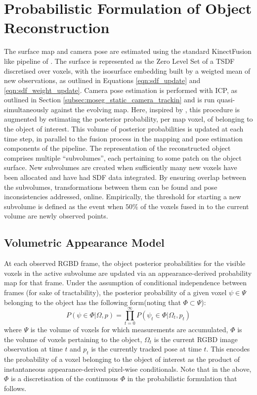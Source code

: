 \section{Probabilistic Formulation of Object Reconstruction}
\label{sec:probobj_prob_formulation}
The surface map and camera pose are estimated using the standard KinectFusion
like pipeline of \cite{Newcombe2011,Prisacariu2014}. The surface is represented
as the Zero Level Set of a TSDF discretised over voxels, with the isosurface 
embedding built by a weigted mean of new observations, as outlined in Equations
\ref{eqn:sdf_update} and \ref{eqn:sdf_weight_update}. Camera pose estimation is
performed with ICP, as outlined in Section \ref{subsec:moseg_static_camera_trackin} 
and is run quasi-simultaneously against the evolving map. Here, inspired by 
\cite{Kolev2006}, this procedure is augmented by estimating the posterior probability, 
per map voxel, of belonging to the object of interest. This volume of posterior 
probabilities is updated at each time step, in parallel to the fusion process in the 
mapping and pose estimation components of the pipeline. The representation of the 
reconstructed object comprises multiple ``subvolumes'', each pertaining to some 
patch on the object surface. New subvolumes are created when sufficiently many new 
voxels have been allocated and have had SDF data integrated. By ensuring overlap
between the subvolumes, transformations between them can be found and pose
inconsistencies addressed, online. Empirically, the threshold for starting a new
subvolume is defined as the event when $50\%$ of the voxels fused in to the
current volume are newly observed points.

\subsection{Volumetric Appearance Model}
\label{subsec:probobj_vol_appearance_model}
At each observed RGBD frame, the object posterior probabilities for the visible
voxels in the active subvolume are updated via an appearance-derived probability
map for that frame. Under the assumption of conditional independence between
frames (for sake of tractability), the posterior probability of a given voxel
$\psi \in \Psi$ belonging to the object has the following form(noting that
$\Phi \subset \Psi$):
\begin{equation}
\label{eqn:probobj_voxel_posterior}
P(\psi \in \Phi | \Omega, p) = \prod_{t=0}^{\infty}
P(\psi_{t} \in \Phi | \Omega_{t}, p_{t})
\end{equation}
where $\Psi$ is the volume of voxels for which measurements are accumulated,
$\Phi$  is the volume of voxels pertaining to the object, $\Omega_{t}$ is the
current RGBD image observation at time $t$ and $p_{t}$ is the currently tracked
pose at time $t$. This encodes the probability of a voxel belonging to the
object of interest as the product of instantaneous appearance-derived pixel-wise
conditionals. Note that in the above, $\Phi$ is a discretisation of the
continuous $\Phi$ in the probabilistic formulation that follows.

